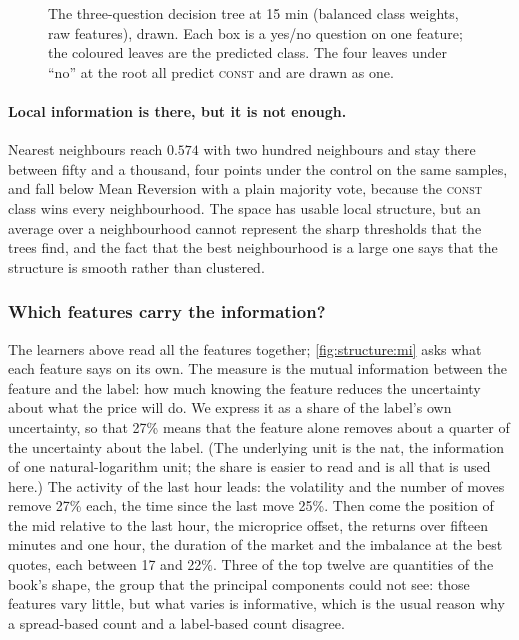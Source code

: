 \begin{figure}[t]
\centering

\caption{The three-question decision tree at 15 min (balanced class weights, raw
features), drawn.  Each box is a yes/no question on one feature; the coloured leaves are
the predicted class.  The four leaves under ``no'' at the root all predict \textsc{const}
and are drawn as one.}
\label{fig:structure:tree}
\end{figure}

\paragraph{Local information is there, but it is not enough.}  Nearest neighbours reach
$0.574$ with two hundred neighbours and stay there between fifty and a thousand, four
points under the control on the same samples, and fall below Mean Reversion with a plain
majority vote, because the \textsc{const} class wins every neighbourhood.  The space has
usable local structure, but an average over a neighbourhood cannot represent the sharp
thresholds that the trees find, and the fact that the best neighbourhood is a large one
says that the structure is smooth rather than clustered.

\subsubsection{Which features carry the information?}
\label{sec:structure:mi}

The learners above read all the features together; \cref{fig:structure:mi} asks what each
feature says on its own.  The measure is the mutual information between the feature and
the label: how much knowing the feature reduces the uncertainty about what the price will
do.  We express it as a share of the label's own uncertainty, so that 27\% means that the
feature alone removes about a quarter of the uncertainty about the label.  (The underlying
unit is the nat, the information of one natural-logarithm unit; the share is easier to
read and is all that is used here.)  The activity of the last hour leads: the volatility
and the number of moves remove 27\% each, the time since the last move 25\%.  Then come the
position of the mid relative to the last hour, the microprice offset, the returns over
fifteen minutes and one hour, the duration of the market and the imbalance at the best
quotes, each between 17 and 22\%.  Three of the top twelve are quantities of the book's
shape, the group that the principal components could not see: those features vary little,
but what varies is informative, which is the usual reason why a spread-based count and a
label-based count disagree.

